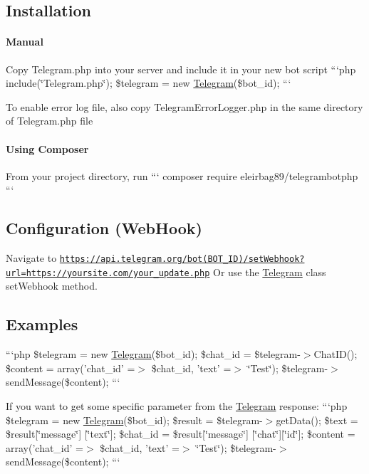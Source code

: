 \subsection*{Installation }

\paragraph*{Manual}


\begin{DoxyItemize}
\item Copy Telegram.\-php into your server and include it in your new bot script ```php include(\char`\"{}\-Telegram.\-php\char`\"{}); \$telegram = new \hyperlink{class_telegram}{Telegram}(\$bot\-\_\-id); ```
\item To enable error log file, also copy Telegram\-Error\-Logger.\-php in the same directory of Telegram.\-php file
\end{DoxyItemize}

\paragraph*{Using Composer}

From your project directory, run ``` composer require eleirbag89/telegrambotphp ```

\subsection*{Configuration (Web\-Hook) }

Navigate to \href{https://api.telegram.org/bot(BOT_ID)/setWebhook?url=https://yoursite.com/your_update.php}{\tt https\-://api.\-telegram.\-org/bot(\-B\-O\-T\-\_\-\-I\-D)/set\-Webhook?url=https\-://yoursite.\-com/your\-\_\-update.\-php} Or use the \hyperlink{class_telegram}{Telegram} class set\-Webhook method.

\subsection*{Examples }

```php \$telegram = new \hyperlink{class_telegram}{Telegram}(\$bot\-\_\-id); \$chat\-\_\-id = \$telegram-\/$>$Chat\-I\-D(); \$content = array('chat\-\_\-id' =$>$ \$chat\-\_\-id, 'text' =$>$ \char`\"{}\-Test\char`\"{}); \$telegram-\/$>$send\-Message(\$content); ```

If you want to get some specific parameter from the \hyperlink{class_telegram}{Telegram} response\-: ```php \$telegram = new \hyperlink{class_telegram}{Telegram}(\$bot\-\_\-id); \$result = \$telegram-\/$>$get\-Data(); \$text = \$result\mbox{[}\char`\"{}message\char`\"{}\mbox{]} \mbox{[}\char`\"{}text\char`\"{}\mbox{]}; \$chat\-\_\-id = \$result\mbox{[}\char`\"{}message\char`\"{}\mbox{]} \mbox{[}\char`\"{}chat\char`\"{}\mbox{]}\mbox{[}\char`\"{}id\char`\"{}\mbox{]}; \$content = array('chat\-\_\-id' =$>$ \$chat\-\_\-id, 'text' =$>$ \char`\"{}\-Test\char`\"{}); \$telegram-\/$>$send\-Message(\$content); ```

